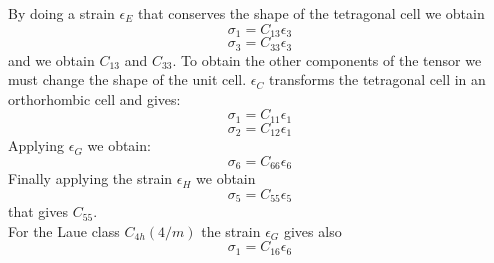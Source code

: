 \documentclass[12pt,a4paper]{article}
\begin{document}
By doing a strain $\epsilon_E$ that conserves the shape of the tetragonal
cell we obtain
\begin{equation}
\sigma_{1} = C_{13} \epsilon_3 
\end{equation}
\begin{equation}
\sigma_{3} = C_{33} \epsilon_3 
\end{equation}
and we obtain $C_{13}$ and $C_{33}$.
To obtain the other components of the tensor we must change the shape of the 
unit cell. $\epsilon_C$ transforms the tetragonal cell in an orthorhombic cell 
and gives:
\begin{equation}
\sigma_{1} = C_{11} \epsilon_1 
\end{equation}
\begin{equation}
\sigma_{2} =  C_{12} \epsilon_1
\end{equation}
Applying $\epsilon_G$ we obtain:
\begin{equation}
\sigma_{6} = C_{66} \epsilon_6 
\end{equation}
Finally applying the strain $\epsilon_H$ we obtain
\begin{equation}
\sigma_{5} = C_{55} \epsilon_5
\end{equation}
that gives $C_{55}$. \\
For the Laue class $C_{4h} (4/m)$ the strain $\epsilon_G$ gives also 
\begin{equation}
\sigma_{1} = C_{16} \epsilon_6 
\end{equation}
\end{document}
